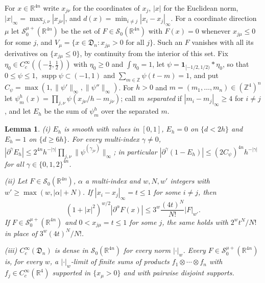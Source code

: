 \documentclass[aps,prd,twocolumn,superscriptaddress,nofootinbib,longbibliography,floatfix,amsmath,amssymb,10pt]{revtex4-2}
\newtheorem{lemma}[theorem]{Lemma}
\theoremstyle{definition}
\theoremstyle{remark}
\newcommand{\R}{\mathbb{R}}
\newcommand{\Z}{\mathbb{Z}}
\begin{document}
For $x\in\R^{4n}$ write $x_{j\nu}$ for the coordinates of $x_j$, $|x|$ for the
Euclidean norm, $|x|_\infty=\max_{j,\nu}|x_{j\nu}|$, and
$d(x)=\min_{i\ne j}|x_i-x_j|_\infty$. For a coordinate direction $\mu$ let
$\mathcal S^{\mu+}_0(\R^{4n})$ be the set of $F\in\mathcal S_0(\R^{4n})$ with
$F(x)=0$ whenever $x_{j\mu}\le0$ for some $j$, and
$V_\mu=\{x\in\mathfrak D_n:x_{j\mu}>0\text{ for all }j\}$. Such an $F$
vanishes with all its derivatives on $\{x_{j\mu}\le0\}$, by continuity from the
interior of this set. Fix $\eta_0\in C^\infty_c((-\frac12,\frac12))$ with
$\eta_0\ge0$ and $\int\eta_0=1$, let $\psi=\mathbf 1_{[-1/2,1/2)}*\eta_0$, so
that $0\le\psi\le1$, $\operatorname{supp}\psi\subset(-1,1)$ and
$\sum_{m\in\Z}\psi(t-m)=1$, and put $C_\psi=\max(1,\|\psi'\|_\infty,\|\psi''\|
_\infty)$. For $h>0$ and $m=(m_1,\dots,m_n)\in(\Z^4)^n$ let
$\psi^h_m(x)=\prod_{j,\nu}\psi(x_{j\nu}/h-m_{j\nu})$; call $m$
\emph{separated} if $|m_i-m_j|_\infty\ge4$ for $i\ne j$, and let $E_h$ be the
sum of $\psi^h_m$ over the separated $m$.

\begin{lemma}\label{lem:limitEcut}
\textup{(i)} $E_h$ is smooth with values in $[0,1]$, $E_h=0$ on $\{d<2h\}$ and
$E_h=1$ on $\{d\ge6h\}$. For every multi-index $\gamma\ne0$,
$|\partial^\gamma E_h|\le2^{4n}h^{-|\gamma|}\prod_{j,\nu}\|\psi^{(\gamma_{j\nu})}
\|_\infty$; in particular $|\partial^\gamma(1-E_h)|\le(2C_\psi)^{4n}
h^{-|\gamma|}$ for all $\gamma\in\{0,1,2\}^{4n}$.

\textup{(ii)} Let $F\in\mathcal S_0(\R^{4n})$, $\alpha$ a multi-index and
$w,N,w'$ integers with $w'\ge\max(w,|\alpha|+N)$. If
$|x_i-x_j|_\infty=t\le1$ for some $i\ne j$, then
\[
(1+|x|^2)^{w/2}|\partial^\alpha F(x)|\le3^w\frac{(4t)^N}{N!}|F|_{w'} .
\]
If $F\in\mathcal S^{\mu+}_0(\R^{4n})$ and $0<x_{j\mu}=t\le1$ for some $j$, the
same holds with $2^wt^N/N!$ in place of $3^w(4t)^N/N!$.

\textup{(iii)} $C^\infty_c(\mathfrak D_n)$ is dense in $\mathcal S_0(\R^{4n})$
for every norm $|\cdot|_w$. Every $F\in\mathcal S^{\mu+}_0(\R^{4n})$ is, for
every $w$, a $|\cdot|_w$-limit of finite sums of products
$f_1\otimes\cdots\otimes f_n$ with $f_j\in C^\infty_c(\R^4)$ supported in
$\{x_\mu>0\}$ and with pairwise disjoint supports.
\end{lemma}
\end{document}
